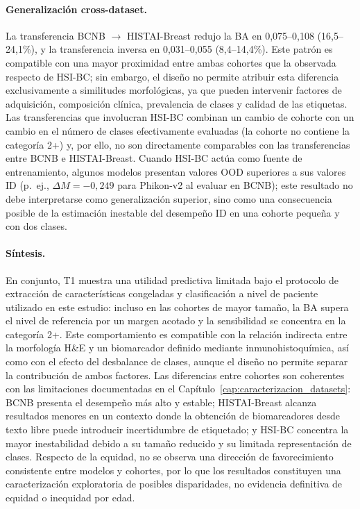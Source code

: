\paragraph{Generalización cross-dataset.} La transferencia BCNB $\rightarrow$ HISTAI-Breast redujo la BA en 0,075--0,108 (16,5--24,1\%), y la transferencia inversa en 0,031--0,055 (8,4--14,4\%). Este patrón es compatible con una mayor proximidad entre ambas cohortes que la observada respecto de HSI-BC; sin embargo, el diseño no permite atribuir esta diferencia exclusivamente a similitudes morfológicas, ya que pueden intervenir factores de adquisición, composición clínica, prevalencia de clases y calidad de las etiquetas. Las transferencias que involucran HSI-BC combinan un cambio de cohorte con un cambio en el número de clases efectivamente evaluadas (la cohorte no contiene la categoría 2+) y, por ello, no son directamente comparables con las transferencias entre BCNB e HISTAI-Breast. Cuando HSI-BC actúa como fuente de entrenamiento, algunos modelos presentan valores OOD superiores a sus valores ID (p.\ ej., $\Delta M = -0{,}249$ para Phikon-v2 al evaluar en BCNB); este resultado no debe interpretarse como generalización superior, sino como una consecuencia posible de la estimación inestable del desempeño ID en una cohorte pequeña y con dos clases.

\paragraph{Síntesis.} En conjunto, T1 muestra una utilidad predictiva limitada bajo el protocolo de extracción de características congeladas y clasificación a nivel de paciente utilizado en este estudio: incluso en las cohortes de mayor tamaño, la BA supera el nivel de referencia por un margen acotado y la sensibilidad se concentra en la categoría 2+. Este comportamiento es compatible con la relación indirecta entre la morfología H\&E y un biomarcador definido mediante inmunohistoquímica, así como con el efecto del desbalance de clases, aunque el diseño no permite separar la contribución de ambos factores. Las diferencias entre cohortes son coherentes con las limitaciones documentadas en el Capítulo~\ref{cap:caracterizacion_datasets}: BCNB presenta el desempeño más alto y estable; HISTAI-Breast alcanza resultados menores en un contexto donde la obtención de biomarcadores desde texto libre puede introducir incertidumbre de etiquetado; y HSI-BC concentra la mayor inestabilidad debido a su tamaño reducido y su limitada representación de clases. Respecto de la equidad, no se observa una dirección de favorecimiento consistente entre modelos y cohortes, por lo que los resultados constituyen una caracterización exploratoria de posibles disparidades, no evidencia definitiva de equidad o inequidad por edad.

